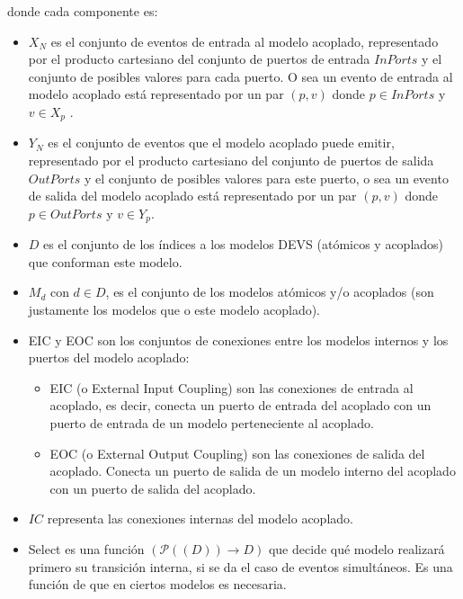 	donde cada componente es:
	\begin{itemize}
	\item $X_N$ es el conjunto de eventos de entrada al modelo acoplado, representado por el producto cartesiano del conjunto de puertos de entrada $InPorts$ y
	 el conjunto de posibles valores para cada puerto. O sea un evento de entrada al modelo acoplado está representado por un par $(p, v)$ donde 
	$p \in InPorts$ y $v \in X_p$ .

	\item $Y_N$ es el conjunto de eventos que el modelo acoplado puede emitir, representado por el producto cartesiano del conjunto de puertos de salida 
	$OutPorts$ y el conjunto de posibles valores para este puerto, o sea un evento de salida del modelo acoplado está representado por un par $(p, v)$ donde 
	$p \in OutPorts$ y $v \in Y_p$.

	\item $D$ es el conjunto de los índices a los modelos DEVS (atómicos y acoplados) que conforman este modelo. 

	\item ${M_d}$ con $d \in D$, es el conjunto de los modelos atómicos y/o acoplados (son justamente los modelos que  o  
	este modelo acoplado).

	\item EIC y EOC son los conjuntos de conexiones entre los modelos internos y los puertos del modelo acoplado:
	      \begin {itemize}
		  \item EIC (o External Input Coupling) son las conexiones de entrada al acoplado, es decir, conecta un puerto de entrada del acoplado con un 
			puerto de entrada de un modelo perteneciente al acoplado.
		  \item EOC (o External Output Coupling) son las conexiones de salida del acoplado. Conecta un puerto de salida de un modelo interno del
			 acoplado con un puerto de salida del acoplado.  
	     \end{itemize}

	\item $IC$ representa las conexiones internas del modelo acoplado.

	\item Select es una función $(\mathcal{P}((D)) \to D)$ que decide qué modelo realizará primero su transición interna, si se da el caso de 
		eventos simultáneos. Es una función de  que en ciertos modelos es necesaria.
	\end{itemize}


